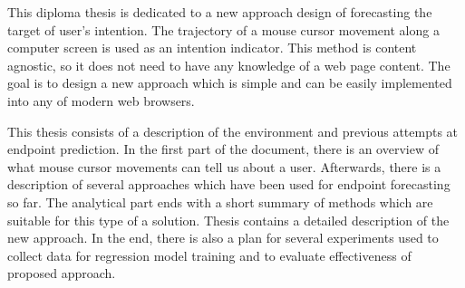 \bigskip{}

This diploma thesis is dedicated to a new approach design  of forecasting the target of user’s intention. The trajectory of a mouse cursor movement along a computer screen is used as an intention indicator. This method is content agnostic, so it does not need to have any knowledge of a web page content. The goal is to design a new approach which is simple and can be easily implemented into any of modern web browsers.

This thesis consists of a description of the environment and previous attempts at endpoint prediction. In the first part of the document, there is an overview of what  mouse cursor movements can tell us about a user. Afterwards, there is a description of several approaches which have been used for endpoint forecasting so far. The analytical part ends with a short summary of methods which are suitable for this type of a solution. Thesis contains a detailed description of the new approach. In the end, there is also a plan for several experiments used to collect data for regression model training and to evaluate effectiveness of proposed approach.


\newpage{}\thispagestyle{empty}\medskip{}


\cleardoublepage
